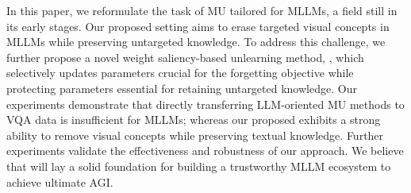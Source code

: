 In this paper, we reformulate the task of MU tailored for MLLMs, a field still in its early stages. Our proposed setting aims to erase targeted visual concepts in MLLMs while preserving untargeted knowledge. To address this challenge, we further propose a novel weight saliency-based unlearning method, \method, which selectively updates parameters crucial for the forgetting objective while protecting parameters essential for retaining untargeted knowledge. Our experiments demonstrate that directly transferring LLM-oriented MU methods to VQA data is insufficient for MLLMs; whereas our proposed \method exhibits a strong ability to remove visual concepts while preserving textual knowledge. Further experiments validate the effectiveness and robustness of our approach. We believe that \method will lay a solid foundation for building a trustworthy MLLM ecosystem to achieve ultimate AGI.
